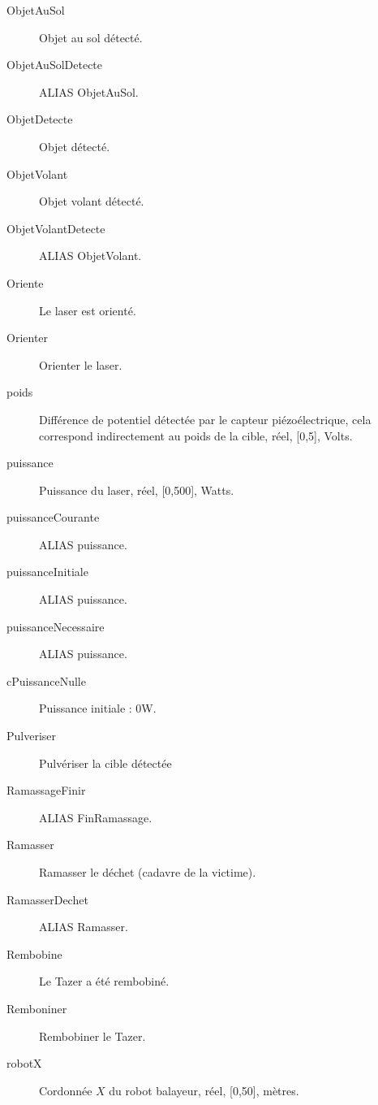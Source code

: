 \begin{description}
	\item [ObjetAuSol]\el
	Objet au sol détecté.

	\item [ObjetAuSolDetecte]\el
	ALIAS ObjetAuSol.

	\item [ObjetDetecte]\el
	Objet détecté.

	\item [ObjetVolant]\el
	Objet volant détecté.

	\item [ObjetVolantDetecte]\el
	ALIAS ObjetVolant.

	\item [Oriente]\el
	Le laser est orienté.

	\item [Orienter]\el
	Orienter le laser.

	\item [poids]\el
	Différence de potentiel détectée par le capteur piézoélectrique, cela correspond indirectement au poids de la cible, réel, [0,5], Volts.

	\item [puissance]\el
	Puissance du laser, réel, [0,500], Watts.

	\item [puissanceCourante]\el
	ALIAS puissance.

	\item [puissanceInitiale]\el
	ALIAS puissance.

	\item [puissanceNecessaire]\el
	ALIAS puissance.

	\item [cPuissanceNulle]\el
	Puissance initiale : 0W.

	\item [Pulveriser]\el
	Pulvériser la cible détectée

	\item [RamassageFinir]\el
	ALIAS FinRamassage.

	\item [Ramasser]\el
	Ramasser le déchet (cadavre de la victime).

	\item [RamasserDechet]\el
	ALIAS Ramasser.

	\item [Rembobine]\el
	Le Tazer a été rembobiné.

	\item [Remboniner]\el
	Rembobiner le Tazer.

	\item [robotX]\el
	Cordonnée $X$ du robot balayeur, réel, [0,50], mètres.


\end{description}
